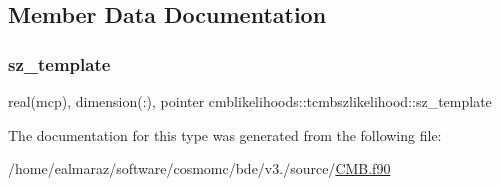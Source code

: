 \subsection{Member Data Documentation}
\mbox{\label{structcmblikelihoods_1_1tcmbszlikelihood_a625b6c3263513211095b9b106aa01453}} 
\subsubsection{\texorpdfstring{sz\+\_\+template}{sz\_template}}
{\footnotesize\ttfamily real(mcp), dimension(\+:), pointer cmblikelihoods\+::tcmbszlikelihood\+::sz\+\_\+template\hspace{0.3cm}{\ttfamily [private]}}



The documentation for this type was generated from the following file\+:\begin{DoxyCompactItemize}
\item 
/home/ealmaraz/software/cosmomc/bde/v3./source/\mbox{\hyperlink{CMB_8f90}{C\+M\+B.\+f90}}\end{DoxyCompactItemize}
